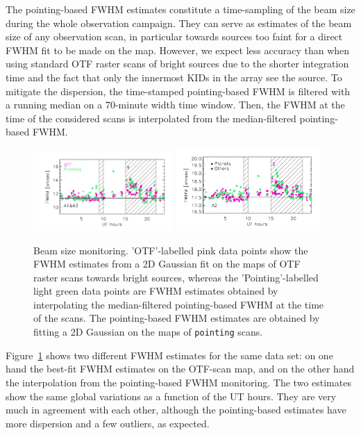 \documentclass[traditionalabstract]{aa}
\newcommand{\lp}[1]{#1}
\begin{document}
{\begin{appendix}
The pointing-based FWHM estimates constitute a time-sampling of the
beam size during the whole observation campaign. They can serve as
estimates of the beam size of any observation scan, in particular
towards sources too faint for a direct FWHM %
fit to be made on the map. However, we
expect less accuracy than when using standard OTF raster
scans of bright sources due to the shorter integration time and the
fact that only the innermost KIDs in the array see the source.
To mitigate the dispersion, the time-stamped
pointing-based FWHM
is filtered with a running median on a 70-minute
width time window. Then, the FWHM %
at the time of the considered scans is
interpolated from the median-filtered pointing-based FWHM.%
%
\begin{figure}[ht!]
  \begin{center}
    \includegraphics[clip=true, trim={0.9cm, 0.5cm, 0.5cm, 0.5cm}, width=0.4725\textwidth]{Figures/Beam_monitoring_with_otfs_vs_ut_compare_pointings_1mm.pdf}
    \includegraphics[clip=true, trim={0.5cm, 0.5cm, 0.5cm, 0.5cm}, width=0.4875\textwidth]{Figures/Beam_monitoring_with_otfs_vs_ut_compare_pointings_a2.pdf}
    \caption[Beam size monitoring comparison]{Beam size monitoring.
     'OTF'-labelled pink data points show the FWHM estimates from a 2D
    Gaussian fit on the maps of OTF raster scans towards bright
    sources, whereas the 'Pointing'-labelled light green data points
    are FWHM estimates obtained by interpolating the {\lp
    median-filtered} pointing-based FWHM at the time of the
    scans. {\lp The
    pointing-based FWHM estimates are obtained by fitting a 2D Gaussian on the
    maps of {\tt pointing} scans.}}
\label{fig:beam_monitoring_compare}
\end{center}
\end{figure}
%
Figure~\ref{fig:beam_monitoring_compare} shows two different FWHM %
estimates for the same data set: on one hand the best-fit FWHM %
estimates on the OTF-scan map, and on the other hand the interpolation from
the pointing-based FWHM %
monitoring. The two estimates show the same global variations as a
function of the UT hours. They are very much in agreement with each
other, although the pointing-based estimates have more dispersion and
a few outliers, as expected.



\end{appendix}}
\end{document}
